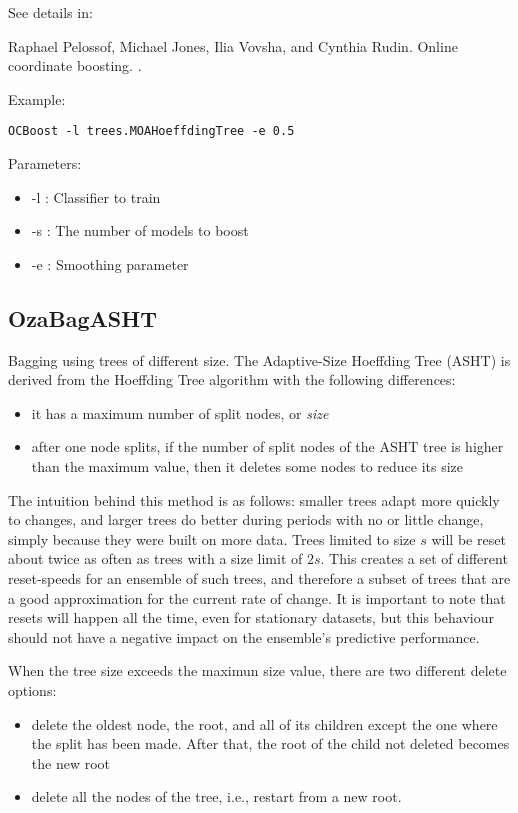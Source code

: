 \documentclass[a4paper,12pt,twoside]{book}
\begin{document}
See details in:

\begin{itemize}
Raphael Pelossof, Michael Jones, Ilia Vovsha, and Cynthia Rudin.
\newblock Online coordinate boosting.
.\end{itemize}

Example:
\begin{footnotesize}\begin{verbatim}
OCBoost -l trees.MOAHoeffdingTree -e 0.5
\end{verbatim}\end{footnotesize}

Parameters:
\begin{itemize}
\item -l : Classifier to train
\item -s : The number of models to boost
\item -e : Smoothing parameter
\end{itemize}

\subsection{OzaBagASHT} Bagging using trees of different size.
The Adaptive-Size Hoeffding Tree (ASHT) is derived
from the Hoeffding Tree algorithm with the following differences:

\begin{itemize}
\item it has a maximum number of split nodes, or {\em size}
\item after one node splits, if the number of split nodes of the ASHT tree is higher than the
maximum value, then it deletes some nodes to reduce its size
\end{itemize}

The intuition behind this method is as follows: smaller trees adapt more quickly to changes,
and larger trees do better during periods with no or little change,
simply because they were built on more data.
Trees limited to size $s$ will be reset about twice as often as
trees with a size limit of $2s$.
This creates a set of different reset-speeds for an ensemble of such trees, and
therefore a subset of trees that are a good approximation for the current rate of change. 
It is important to note that resets will happen all the time, even for stationary datasets,
but this behaviour should not have a negative impact on the ensemble's predictive performance.

When the tree size exceeds
the maximun size value, there are two different delete options:
\begin{itemize}
 \item delete the oldest node, the root, and all of its children
except the one where the split has
been made. After that, the root of the
child not deleted becomes the new root

 \item delete all the nodes of the tree, i.e., restart from a new root.
\end{itemize}
\end{document}
